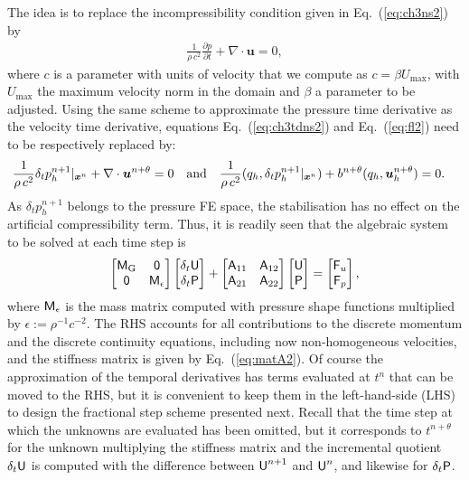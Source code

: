 \documentclass[11pt,a4paper,oneside,reqno]{amsart}
\newcommand{\Eq}[1]{(\ref{eq:#1})}
\def\u{{\bm u}}
\def\mA{\hbox{{\sffamily A}}}
\def\mM{\hbox{{\sffamily M}}}
\def\mU{\hbox{{\sffamily U}}}
\def\mP{\hbox{{\sffamily P}}}
\def\mF{\hbox{{\sffamily F}}}
\def\mzero{\hbox{{\sffamily 0}}}
\begin{document}
The idea is to replace the incompressibility condition given in Eq.~\Eq{ch3ns2} by 
\begin{align*}
\frac{1}{\rho \, c^2}\frac{\partial p}{\partial t} + \nabla\cdot \u = 0,
\end{align*}
where $c$ is a parameter with units of velocity that we compute as $c = \beta U_{\max}$, with $U_{\max}$ the maximum velocity norm in the domain and $\beta$ a parameter to be adjusted. Using the same scheme to approximate the pressure time derivative as the velocity time derivative, equations Eq.~\Eq{ch3tdns2} and Eq.~\Eq{fl2} need to be respectively replaced by:
\begin{align*}
\frac{1}{\rho \, c^2} \delta_t p_h^{n+1} \vert_{{\bm x}^n} + \nabla\cdot\u^{n+\theta} & = 0\quad \hbox{and}\quad 
\frac{1}{\rho \, c^2} ( q_h , \delta_t p_h^{n+1} \vert_{{\bm x}^n}) + b^{n+\theta} ( q_h , \u_h^{n+\theta} ) = 0.
\end{align*}
As  $\delta_t p_h^{n+1}$ belongs to the pressure FE space, the stabilisation has no effect on the artificial compressibility term. Thus, it is readily seen that the algebraic system to be solved at each time step is
\begin{align}
\left[ \begin{matrix} 
\mM_{\rm G}  & \mzero \cr
\mzero & \mM_\epsilon
\end{matrix}\right]
\left[ \begin{matrix} \delta_t \mU \cr \delta_t \mP
\end{matrix}\right]
+ \left[ \begin{matrix} 
\mA_{11} & \mA_{12}  \cr
\mA_{21} & \mA_{22}
\end{matrix}\right]
\left[ \begin{matrix} \mU \cr \mP
\end{matrix}\right]
= \left[ \begin{matrix} \mF_u \cr \mF_p \end{matrix}\right],\label{eq:fs1}
\end{align}
where $\mM_\epsilon$ is the mass matrix computed with pressure shape functions multiplied by $\epsilon := \rho^{-1} c^{-2}$. The RHS accounts for all contributions to the discrete momentum and the discrete continuity equations, including now non-homogeneous velocities, and the stiffness matrix is given by Eq.~\Eq{matA2}. Of course the approximation of the temporal derivatives has terms evaluated at $t^n$ that can be moved to the RHS, but it is convenient to keep them in the left-hand-side (LHS) to design the fractional step scheme presented next. Recall that the time step at which the unknowns are evaluated has been omitted, but it corresponds to $t^{n+\theta}$ for the unknown multiplying the stiffness matrix and the incremental quotient $\delta_t \mU$ is computed with the difference between $\mU^{n+1}$ and $\mU^n$, and likewise for $\delta_t \mP$.
\end{document}
